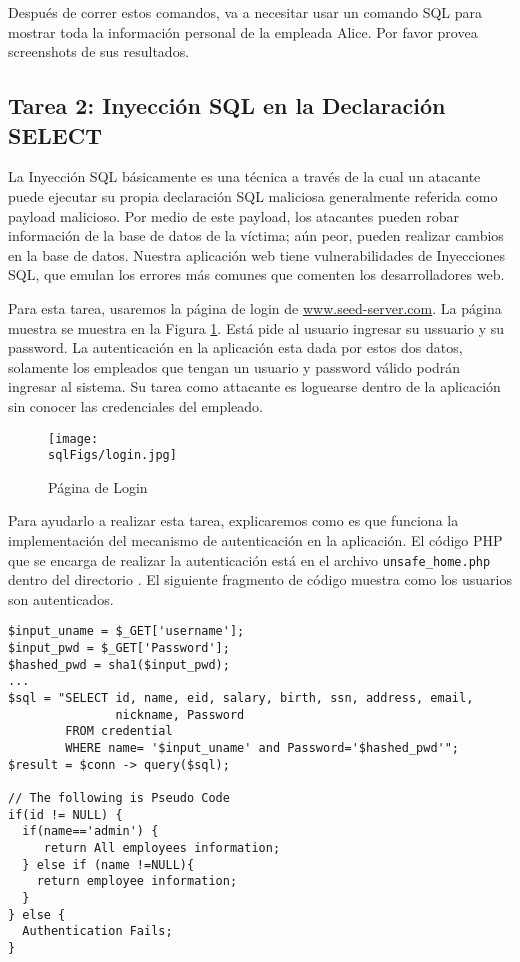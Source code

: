 Después de correr estos comandos, va a necesitar usar un comando SQL para mostrar toda la información personal de la empleada Alice. Por favor provea screenshots de sus resultados.

\subsection{Tarea 2: Inyección SQL en la Declaración SELECT} 

La Inyección SQL básicamente es una técnica a través de la cual un atacante puede ejecutar su propia declaración SQL maliciosa generalmente referida como payload malicioso. Por medio de este payload, los atacantes pueden robar información de la base de datos de la víctima; aún peor, pueden realizar cambios en la base de datos. Nuestra aplicación web tiene vulnerabilidades de Inyecciones SQL, que emulan los errores más comunes que comenten los desarrolladores web.

Para esta tarea, usaremos la página de login de \url{www.seed-server.com}.
La página muestra se muestra en la Figura \ref{sql:fig:login}.
Está pide al usuario ingresar su ussuario y su password.
La autenticación en la aplicación esta dada por estos dos datos, solamente los empleados que tengan un usuario y password válido podrán ingresar al sistema.
Su tarea como attacante es loguearse dentro de la aplicación sin conocer las credenciales del empleado. 


\begin{figure}[htb]
\begin{center}
\texttt{[image: \\sqlFigs/login.jpg]}
\end{center}
\caption{Página de Login}
\label{sql:fig:login}
\end{figure}
 
Para ayudarlo a realizar esta tarea, explicaremos como es que funciona la implementación del mecanismo de autenticación en la aplicación. El código PHP que se encarga de realizar la autenticación está en el archivo \texttt{unsafe\_home.php} dentro del directorio .
El siguiente fragmento de código muestra como los usuarios son autenticados.

\begin{lstlisting}
$input_uname = $_GET['username'];
$input_pwd = $_GET['Password'];
$hashed_pwd = sha1($input_pwd);
...
$sql = "SELECT id, name, eid, salary, birth, ssn, address, email, 
               nickname, Password
        FROM credential
        WHERE name= '$input_uname' and Password='$hashed_pwd'";
$result = $conn -> query($sql);

// The following is Pseudo Code 
if(id != NULL) {
  if(name=='admin') {
     return All employees information;
  } else if (name !=NULL){
    return employee information;
  }
} else {
  Authentication Fails;
}
\end{lstlisting}

